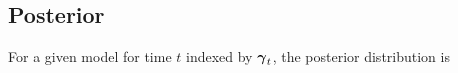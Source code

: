 \documentclass[fleqn]{article}
\def\bm#1{\mbox{\boldmath $#1$}}
\begin{document}
\subsection{Posterior}
%
For a given model for time $t$ indexed by $\bm{\gamma}_t$, the posterior distribution is
%
\end{document}
